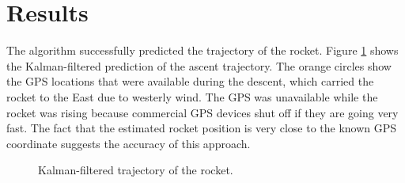 \documentclass{article}
\begin{document}
\section{Results}
The algorithm successfully predicted the trajectory of the rocket. Figure \ref{fig:trajectory} shows the Kalman-filtered prediction of the ascent trajectory. The orange circles show the GPS locations that were available during the descent, which carried the rocket to the East due to westerly wind. The GPS was unavailable while the rocket was rising because commercial GPS devices shut off if they are going very fast. The fact that the estimated rocket position is very close to the known GPS coordinate suggests the accuracy of this approach.

\begin{figure}[htbp]%
    \centering
    \caption{Kalman-filtered trajectory of the rocket.}%
    \label{fig:trajectory}
\end{figure}
\end{document}
